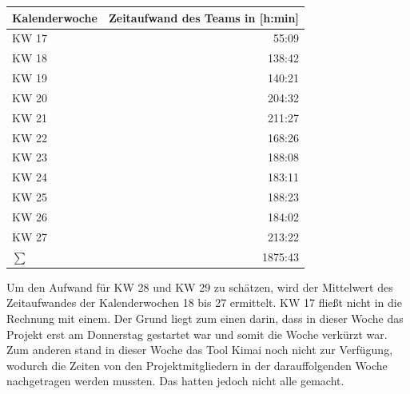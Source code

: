 \documentclass[../review_3.tex]{subfiles}
\begin{document}
\begin{longtable} [h] {l r} \toprule
    \textbf{Kalenderwoche} & \textbf{Zeitaufwand des Teams in [h:min]} \\ \midrule \endhead
    KW 17                  & 55:09                                     \\
    KW 18                  & 138:42                                    \\
    KW 19                  & 140:21                                    \\
    KW 20                  & 204:32                                    \\
    KW 21                  & 211:27                                    \\
    KW 22                  & 168:26                                    \\
    KW 23                  & 188:08                                    \\
    KW 24                  & 183:11                                    \\
    KW 25                  & 188:23                                    \\
    KW 26                  & 184:02                                    \\
    KW 27                  & 213:22                                    \\  \midrule
    $\sum$                 & 1875:43                                   \\ \bottomrule
\end{longtable}

Um den Aufwand für KW 28 und KW 29 zu schätzen, wird der Mittelwert des Zeitaufwandes der Kalenderwochen 18 bis 27 ermittelt. KW 17 fließt nicht in die Rechnung mit einem. Der Grund liegt zum einen darin, dass in dieser Woche das Projekt erst am Donnerstag gestartet war und somit die Woche verkürzt war. Zum anderen stand in dieser Woche das Tool Kimai noch nicht zur Verfügung, wodurch die Zeiten von den Projektmitgliedern in der darauffolgenden Woche nachgetragen werden mussten. Das hatten jedoch nicht alle gemacht.
\end{document}
